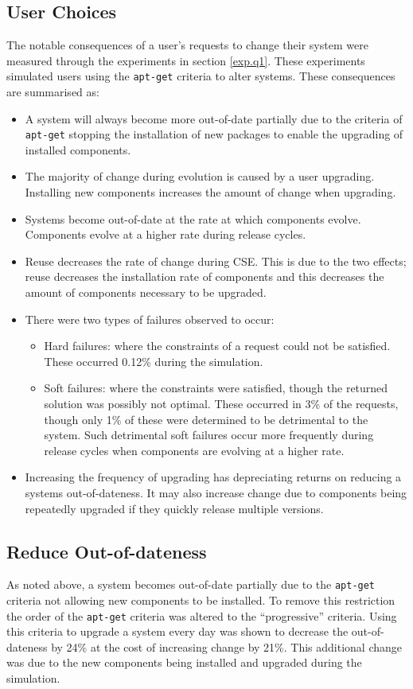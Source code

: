 \subsection{User Choices}
The notable consequences of a user's requests to change their system were measured through the experiments in section \ref{exp.q1}.
These experiments simulated users using the \texttt{apt-get} criteria  to alter systems.
These consequences are summarised as:
\begin{itemize}
	\item A system will always become more out-of-date partially due to the criteria of \texttt{apt-get} stopping the installation of new packages 
	to enable the upgrading of installed components.  
	\item The majority of change during evolution is caused by a user upgrading.
	Installing new components increases the amount of change when upgrading.
	\item Systems become out-of-date at the rate at which components evolve. Components evolve at a higher rate during release cycles.
	\item Reuse decreases the rate of change during CSE.
	This is due to the two effects; 
	reuse decreases the installation rate of components and this decreases the amount of components necessary to be upgraded.   
	\item There were two types of failures observed to occur:
		\begin{itemize}
  			\item Hard failures: where the constraints of a request could not be satisfied. These occurred 0.12\% during the simulation.
  			\item Soft failures: where the constraints were satisfied, though the returned solution was possibly not optimal.
  				These occurred in 3\% of the requests, though only 1\% of these were determined to be detrimental to the system.
  				Such detrimental soft failures occur more frequently during release cycles when components are evolving at a higher rate.
		\end{itemize}
	\item Increasing the frequency of upgrading has depreciating returns on reducing a systems out-of-dateness. 
	It may also increase change due to components being repeatedly upgraded if they quickly release multiple versions. 
\end{itemize}

\subsection{Reduce Out-of-dateness}
As noted above, a system becomes out-of-date partially due to the \texttt{apt-get} criteria not allowing new components to be installed.
To remove this restriction the order of the \texttt{apt-get} criteria was altered to the ``progressive'' criteria.
Using this criteria to upgrade a system every day was shown to decrease the out-of-dateness by 24\% at the cost of increasing change by 21\%.
This additional change was due to the new components being installed and upgraded during the simulation.


